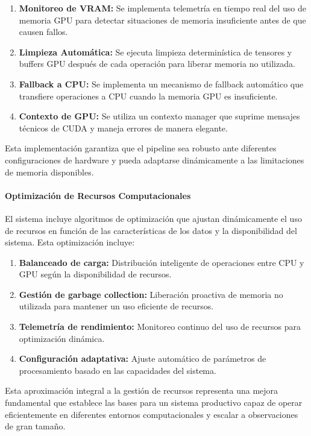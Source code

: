 \begin{enumerate}
    \item \textbf{Monitoreo de VRAM:} Se implementa telemetría en tiempo real del uso de memoria GPU para detectar situaciones de memoria insuficiente antes de que causen fallos.
    \item \textbf{Limpieza Automática:} Se ejecuta limpieza determinística de tensores y buffers GPU después de cada operación para liberar memoria no utilizada.
    \item \textbf{Fallback a CPU:} Se implementa un mecanismo de fallback automático que transfiere operaciones a CPU cuando la memoria GPU es insuficiente.
    \item \textbf{Contexto de GPU:} Se utiliza un contexto manager que suprime mensajes técnicos de CUDA y maneja errores de manera elegante.
\end{enumerate}

Esta implementación garantiza que el pipeline sea robusto ante diferentes configuraciones de hardware y pueda adaptarse dinámicamente a las limitaciones de memoria disponibles.

\paragraph{Optimización de Recursos Computacionales}

El sistema incluye algoritmos de optimización que ajustan dinámicamente el uso de recursos en función de las características de los datos y la disponibilidad del sistema. Esta optimización incluye:

\begin{enumerate}
    \item \textbf{Balanceado de carga:} Distribución inteligente de operaciones entre CPU y GPU según la disponibilidad de recursos.
    \item \textbf{Gestión de garbage collection:} Liberación proactiva de memoria no utilizada para mantener un uso eficiente de recursos.
    \item \textbf{Telemetría de rendimiento:} Monitoreo continuo del uso de recursos para optimización dinámica.
    \item \textbf{Configuración adaptativa:} Ajuste automático de parámetros de procesamiento basado en las capacidades del sistema.
\end{enumerate}

Esta aproximación integral a la gestión de recursos representa una mejora fundamental que establece las bases para un sistema productivo capaz de operar eficientemente en diferentes entornos computacionales y escalar a observaciones de gran tamaño.


